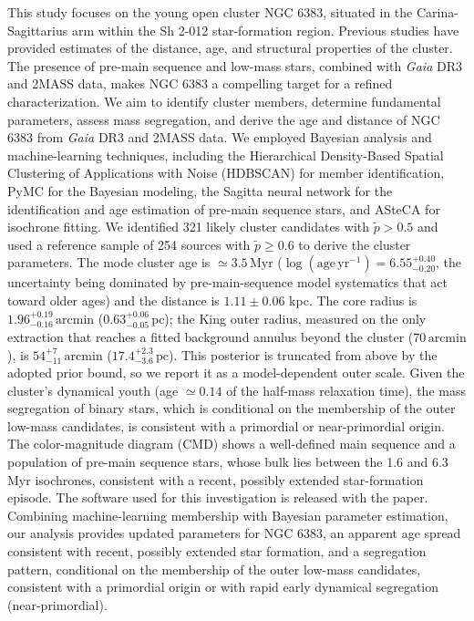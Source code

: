 \documentclass{aa}
\begin{document}
  \abstract
   {This study focuses on the young open cluster NGC 6383, situated in the Carina-Sagittarius arm within the Sh 2-012 star-formation region. Previous studies have provided estimates of the distance, age, and structural properties of the cluster. The presence of pre-main sequence and low-mass stars, combined with \textit{Gaia} DR3 and 2MASS data, makes NGC 6383 a compelling target for a refined characterization.}
   {We aim to identify cluster members, determine fundamental parameters, assess mass segregation, and derive the age and distance of NGC 6383 from \textit{Gaia} DR3 and 2MASS data.}
   {We employed Bayesian analysis and machine-learning techniques, including the Hierarchical Density-Based Spatial Clustering of Applications with Noise (HDBSCAN) for member identification, PyMC for the Bayesian modeling, the Sagitta neural network for the identification and age estimation of pre-main sequence stars, and ASteCA for isochrone fitting.}   
   {We identified 321 likely cluster candidates with $\tilde{p}>0.5$ and used a reference sample of 254 sources with $\tilde{p}\geq0.6$ to derive the cluster parameters. The mode cluster age is $\simeq3.5\,\mathrm{Myr}$ ($\log(\mathrm{age}\,\mathrm{yr^{-1}}) = 6.55^{+0.40}_{-0.20}$, the uncertainty being dominated by pre-main-sequence model systematics that act toward older ages) and the distance is $1.11\pm 0.06$ kpc. The core radius is $1.96^{+0.19}_{-0.16}\,\mathrm{arcmin}$ ($0.63^{+0.06}_{-0.05}\,\mathrm{pc}$); the King outer radius, measured on the only extraction that reaches a fitted background annulus beyond the cluster ($70\,\mathrm{arcmin}$), is $54^{+7}_{-11}\,\mathrm{arcmin}$ ($17.4^{+2.3}_{-3.6}\,\mathrm{pc}$). This posterior is truncated from above by the adopted prior bound, so we report it as a model-dependent outer scale. Given the cluster's dynamical youth (age $\simeq0.14$ of the half-mass relaxation time), the mass segregation of binary stars, which is conditional on the membership of the outer low-mass candidates, is consistent with a primordial or near-primordial origin. The color-magnitude diagram (CMD) shows a well-defined main sequence and a population of pre-main sequence stars, whose bulk lies between the 1.6 and 6.3 Myr isochrones, consistent with a recent, possibly extended star-formation episode. The software used for this investigation is released with the paper.}
   {Combining machine-learning membership with Bayesian parameter estimation, our analysis provides updated parameters for NGC 6383, an apparent age spread consistent with recent, possibly extended star formation, and a segregation pattern, conditional on the membership of the outer low-mass candidates, consistent with a primordial origin or with rapid early dynamical segregation (near-primordial).}
\end{document}
